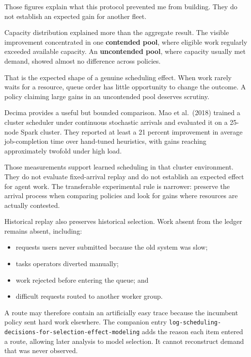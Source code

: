 Those figures explain what this protocol prevented me from building. They do not establish an expected gain for another fleet.

Capacity distribution explained more than the aggregate result. The visible improvement concentrated in one \textbf{contended pool}, where eligible work regularly exceeded available capacity. An \textbf{uncontended pool}, where capacity usually met demand, showed almost no difference across policies.

That is the expected shape of a genuine scheduling effect. When work rarely waits for a resource, queue order has little opportunity to change the outcome. A policy claiming large gains in an uncontended pool deserves scrutiny.

Decima provides a useful but bounded comparison. Mao et al.~(2018) trained a cluster scheduler under continuous stochastic arrivals and evaluated it on a 25-node Spark cluster. They reported at least a 21 percent improvement in average job-completion time over hand-tuned heuristics, with gains reaching approximately twofold under high load.

Those measurements support learned scheduling in that cluster environment. They do not evaluate fixed-arrival replay and do not establish an expected effect for agent work. The transferable experimental rule is narrower: preserve the arrival process when comparing policies and look for gains where resources are actually contested.

Historical replay also preserves historical selection. Work absent from the ledger remains absent, including:

\begin{itemize}
\tightlist
\item
  requests users never submitted because the old system was slow;
\item
  tasks operators diverted manually;
\item
  work rejected before entering the queue; and
\item
  difficult requests routed to another worker group.
\end{itemize}

A route may therefore contain an artificially easy trace because the incumbent policy sent hard work elsewhere. The companion entry \texttt{log-scheduling-decisions-for-selection-effect-modeling} adds the reason each item entered a route, allowing later analysis to model selection. It cannot reconstruct demand that was never observed.

